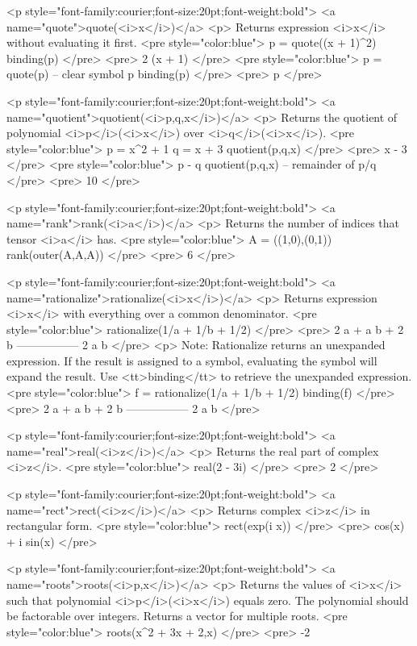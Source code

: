 <p style="font-family:courier;font-size:20pt;font-weight:bold">
<a name="quote">quote(<i>x</i>)</a>
<p>
Returns expression <i>x</i> without evaluating it first.
<pre style="color:blue">
p = quote((x + 1)^2)
binding(p)
</pre>
<pre>
       2
(x + 1)
</pre>
<pre style="color:blue">
p = quote(p) -- clear symbol p
binding(p)
</pre>
<pre>
p
</pre>

<p style="font-family:courier;font-size:20pt;font-weight:bold">
<a name="quotient">quotient(<i>p,q,x</i>)</a>
<p>
Returns the quotient of polynomial <i>p</i>(<i>x</i>) over <i>q</i>(<i>x</i>).
<pre style="color:blue">
p = x^2 + 1
q = x + 3
quotient(p,q,x)
</pre>
<pre>
x - 3
</pre>
<pre style="color:blue">
p - q quotient(p,q,x) -- remainder of p/q
</pre>
<pre>
10
</pre>

<p style="font-family:courier;font-size:20pt;font-weight:bold">
<a name="rank">rank(<i>a</i>)</a>
<p>
Returns the number of indices that tensor <i>a</i> has.
<pre style="color:blue">
A = ((1,0),(0,1))
rank(outer(A,A,A))
</pre>
<pre>
6
</pre>

<p style="font-family:courier;font-size:20pt;font-weight:bold">
<a name="rationalize">rationalize(<i>x</i>)</a>
<p>
Returns expression <i>x</i> with everything over a common denominator.
<pre style="color:blue">
rationalize(1/a + 1/b + 1/2)
</pre>
<pre>
 2 a + a b + 2 b
-----------------
      2 a b
</pre>
<p>
Note: Rationalize returns an unexpanded expression.
If the result is assigned to a symbol,
evaluating the symbol will expand the result.
Use <tt>binding</tt> to retrieve the unexpanded expression.
<pre style="color:blue">
f = rationalize(1/a + 1/b + 1/2)
binding(f)
</pre>
<pre>
 2 a + a b + 2 b
-----------------
      2 a b
</pre>

<p style="font-family:courier;font-size:20pt;font-weight:bold">
<a name="real">real(<i>z</i>)</a>
<p>
Returns the real part of complex <i>z</i>.
<pre style="color:blue">
real(2 - 3i)
</pre>
<pre>
2
</pre>

<p style="font-family:courier;font-size:20pt;font-weight:bold">
<a name="rect">rect(<i>z</i>)</a>
<p>
Returns complex <i>z</i> in rectangular form.
<pre style="color:blue">
rect(exp(i x))
</pre>
<pre>
cos(x) + i sin(x)
</pre>

<p style="font-family:courier;font-size:20pt;font-weight:bold">
<a name="roots">roots(<i>p,x</i>)</a>
<p>
Returns the values of <i>x</i> such that polynomial
<i>p</i>(<i>x</i>) equals zero.
The polynomial should be factorable over integers.
Returns a vector for multiple roots.
<pre style="color:blue">
roots(x^2 + 3x + 2,x)
</pre>
<pre>
-2

